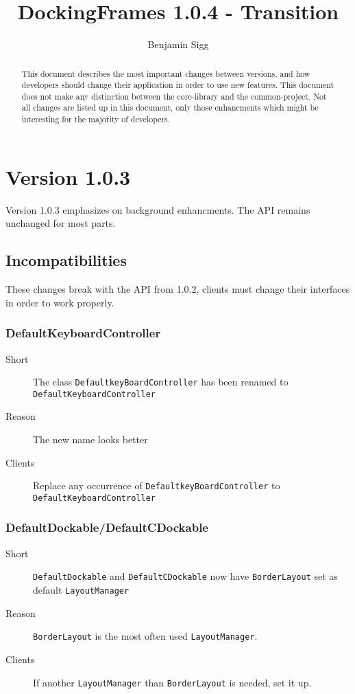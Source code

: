 \documentclass[a4paper,10pt]{article}
\title{DockingFrames 1.0.4 - Transition}
\author{Benjamin Sigg}
\newcommand{\src}[1]{\lstinline[basicstyle=\normalsize\ttfamily,keywordstyle=\normalsize\ttfamily,identifierstyle=\normalsize\ttfamily]|#1|}
\newcommand{\short}{\item[Short]}
\newcommand{\why}{\item[Reason]}
\newcommand{\clients}{\item[Clients]}
\begin{document}
\maketitle
\tableofcontents
\newpage


\begin{abstract}
This document describes the most important changes between versions, and how developers should change their application in order to use new features. This document does not make any distinction between the core-library and the common-project. Not all changes are listed up in this document, only those enhancments which might be interesting for the majority of developers.
\end{abstract}

\section{Version 1.0.3}
Version 1.0.3 emphasizes on background enhancments. The API remains unchanged for most parts.
\subsection{Incompatibilities}
These changes break with the API from 1.0.2, clients must change their interfaces in order to work properly.

\subsubsection{DefaultKeyboardController}
\begin{description}
\short The class \src{DefaultkeyBoardController} has been renamed to \\\src{DefaultKeyboardController} 
\why The new name looks better
\clients Replace any occurrence of \src{DefaultkeyBoardController} to \\\src{DefaultKeyboardController}
\end{description}

\subsubsection{DefaultDockable/DefaultCDockable}
\begin{description}
 \short \src{DefaultDockable} and \src{DefaultCDockable} now have \src{BorderLayout} set as default \src{LayoutManager}
 \why \src{BorderLayout} is the most often used \src{LayoutManager}.
 \clients If another \src{LayoutManager} than \src{BorderLayout} is needed, set it up.
\end{description}
\end{document}
